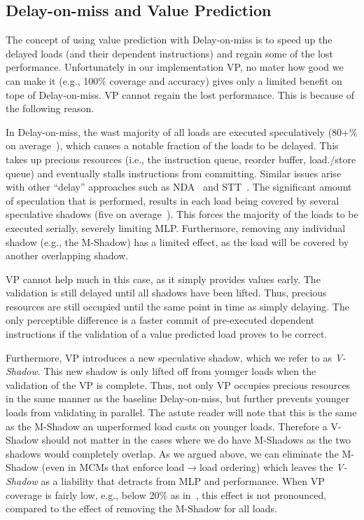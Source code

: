 \subsection{Delay-on-miss and Value Prediction} 

The concept of using value prediction with Delay-on-miss is to speed up the delayed loads (and their dependent instructions) and regain some of the lost performance. Unfortunately in our implementation VP, no mater how good we can make it (e.g., 100\% coverage and accuracy) gives only a limited benefit on tope of Delay-on-miss. VP cannot regain the lost performance. This is because of the following reason.

In Delay-on-miss, the wast majority of all loads are executed speculatively (80+\% on average~\cite{}), which causes a notable fraction of the loads to be delayed. This takes up precious resources (i.e., the instruction queue, reorder buffer, load./store queue) and eventually stalls instructions from committing. Similar issues arise with other ``delay'' approaches such as NDA~\cite{} and STT~\cite{}.
The significant amount of speculation that is performed, results in each load being covered by several speculative shadows (five on average~\cite{}). This forces the majority of the loads to be executed serially, severely limiting MLP. Furthermore, removing any individual shadow (e.g., the M-Shadow) has a limited effect, as the load will be covered by another overlapping shadow.

VP cannot help much in this case, as it simply provides values early. The validation is still delayed until all shadows have been lifted. Thus, precious resources are still occupied until the same point in time as simply delaying.
The only perceptible difference is a faster commit of pre-executed dependent instructions if the validation of a value predicted load proves to be correct.

Furthermore, VP introduces a new speculative shadow, which we refer to as \emph{V-Shadow}. This new shadow is only lifted off from younger loads when the validation of the VP is complete. Thus, not only VP occupies precious resources in the same manner as the baseline Delay-on-miss, but further prevents younger loads from validating in parallel. The astute reader will note that this is the same as the M-Shadow an unperformed load casts on younger loads. Therefore a V-Shadow should not matter in the cases where we do have M-Shadows as the two shadows would completely overlap. As we argued above, we can eliminate the M-Shadow (even in MCMs that enforce load$\rightarrow$load ordering) which leaves the \emph{V-Shadow} as a liability that detracts from MLP and performance.
When VP coverage is fairly low, e.g., below 20\% as in~\cite{}, this effect is not pronounced, compared to the effect of removing the M-Shadow for all loads.

